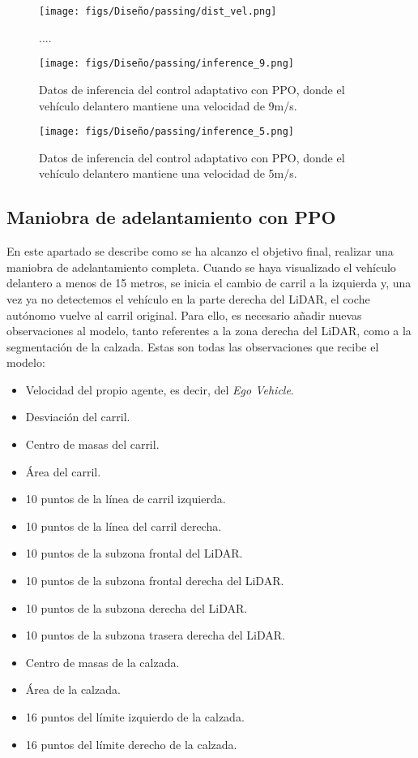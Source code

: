 \begin{figure}[ht]
  \centering
  \texttt{[image: figs/Diseño/passing/dist\_vel.png]}
  \caption{....}
  \label{fig:dist_vel}
\end{figure}

\begin{figure}[ht]
  \centering
  \texttt{[image: figs/Diseño/passing/inference\_9.png]}
  \caption{Datos de inferencia del control adaptativo con \ac{PPO}, donde el vehículo delantero mantiene una velocidad de 9m/s.}
  \label{fig:infrence_passing}
\end{figure}
\begin{figure}[ht]
  \centering
  \texttt{[image: figs/Diseño/passing/inference\_5.png]}
  \caption{Datos de inferencia del control adaptativo con \ac{PPO}, donde el vehículo delantero mantiene una velocidad de 5m/s.}
  \label{fig:infrence_passing}
\end{figure}

\subsection{Maniobra de adelantamiento con PPO}

En este apartado se describe como se ha alcanzo el objetivo final, realizar una maniobra de adelantamiento completa. Cuando se haya visualizado el vehículo delantero a menos de 15 metros, se inicia el cambio de carril a la izquierda y, una vez ya no detectemos el vehículo en la parte derecha del \ac{LiDAR}, el coche autónomo vuelve al carril original. Para ello, es necesario añadir nuevas observaciones al modelo, tanto referentes a la zona derecha del \ac{LiDAR}, como a la segmentación de la calzada. Estas son todas las observaciones que recibe el modelo:
\begin{itemize}
\item Velocidad del propio agente, es decir, del \textit{Ego Vehicle}.
\item Desviación del carril.
\item Centro de masas del carril.
\item Área del carril.
\item 10 puntos de la línea de carril izquierda.
\item 10 puntos de la línea del carril derecha.
\item 10 puntos de la subzona frontal del \ac{LiDAR}.
\item 10 puntos de la subzona frontal derecha del \ac{LiDAR}.
\item 10 puntos de la subzona derecha del \ac{LiDAR}.
\item 10 puntos de la subzona trasera derecha del \ac{LiDAR}.
\item Centro de masas de la calzada.
\item Área de la calzada.
\item 16 puntos del límite izquierdo de la calzada.
\item 16 puntos del límite derecho de la calzada.
\end{itemize}

